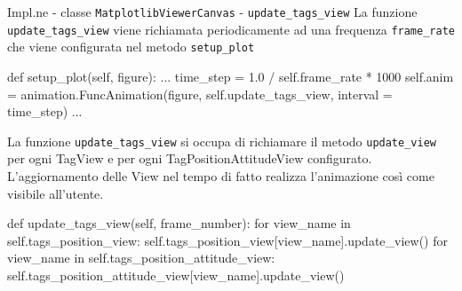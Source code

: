 \begin{frame}[fragile, shrink=10]{Impl.ne - classe \lstinline!MatplotlibViewerCanvas! - \lstinline!update_tags_view!}
  La funzione \lstinline!update_tags_view! viene richiamata periodicamente ad una frequenza \lstinline!frame_rate!
  che viene configurata nel metodo \lstinline!setup_plot!
  \begin{Python}
    def setup_plot(self, figure):
        ...
        time_step = 1.0 / self.frame_rate * 1000
        self.anim = animation.FuncAnimation(figure, self.update_tags_view, interval = time_step)
        ...
  \end{Python}

  La funzione \lstinline!update_tags_view! si occupa di richiamare il metodo \lstinline!update_view!
  per ogni TagView e per ogni TagPositionAttitudeView configurato. L'aggiornamento delle View nel tempo
  di fatto realizza l'animazione così come visibile all'utente.
  \begin{Python}
    def update_tags_view(self, frame_number):
        for view_name in self.tags_position_view:
            self.tags_position_view[view_name].update_view()
        for view_name in self.tags_position_attitude_view:
            self.tags_position_attitude_view[view_name].update_view()
  \end{Python}

\end{frame}

